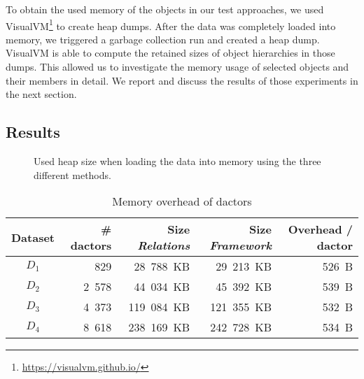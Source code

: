   To obtain the used memory of the objects in our test approaches, we used VisualVM\footnote{\url{https://visualvm.github.io/}} to create heap dumps.
  After the data was completely loaded into memory, we triggered a garbage collection run and created a heap dump.
  VisualVM is able to compute the retained sizes of object hierarchies in those dumps.
  This allowed us to investigate the memory usage of selected objects and their members in detail.
  We report and discuss the results of those experiments in the next section.

\subsection{Results}

  \begin{figure}
    \centering
    \caption{Used heap size when loading the data into memory using the three different methods.}
    \label{fig:exp:general}
  \end{figure}

  \begin{table}
    \centering
    \begin{tabular}{crrrr}
      \toprule
      \textbf{Dataset} & \textbf{\# \glspl{dactor}} & \textbf{Size \textit{Relations}} & \textbf{Size \textit{Framework}} & \textbf{Overhead / \gls{dactor}}\\
      \midrule
      $D_1$ & 829 & 28~788~KB & 29~213~KB & 526~B \\
      $D_2$ & 2~578 & 44~034~KB & 45~392~KB & 539~B \\
      $D_3$ & 4~373 & 119~084~KB & 121~355~KB & 532~B \\
      $D_4$ & 8~618 & 238~169~KB & 242~728~KB & 534~B \\
      \bottomrule
    \end{tabular}
    \caption{Memory overhead of \glspl{dactor}}
    \label{tab:memory_overhead}
  \end{table}

